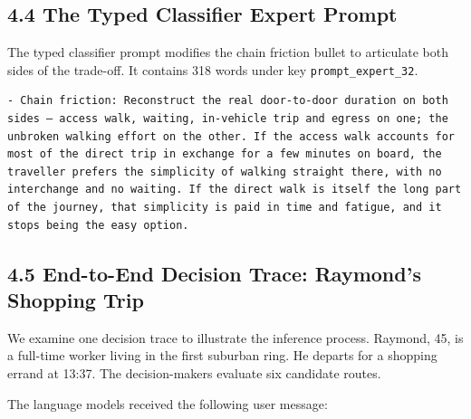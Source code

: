 \subsection{4.4 The Typed Classifier Expert Prompt}

The typed classifier prompt modifies the chain friction bullet to articulate both sides of the trade-off. It contains 318 words under key \texttt{prompt_expert_32}.

\begin{Verbatim}
- Chain friction: Reconstruct the real door-to-door duration on both sides — access walk, waiting, in-vehicle trip and egress on one; the unbroken walking effort on the other. If the access walk accounts for most of the direct trip in exchange for a few minutes on board, the traveller prefers the simplicity of walking straight there, with no interchange and no waiting. If the direct walk is itself the long part of the journey, that simplicity is paid in time and fatigue, and it stops being the easy option.
\end{Verbatim}

\subsection{4.5 End-to-End Decision Trace: Raymond's Shopping Trip}

We examine one decision trace to illustrate the inference process. Raymond, 45, is a full-time worker living in the first suburban ring. He departs for a shopping errand at 13:37. The decision-makers evaluate six candidate routes.

The language models received the following user message:

